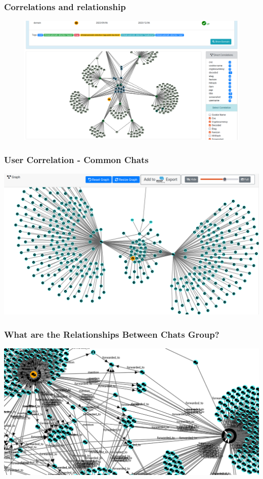 \documentclass{beamer}
\begin{document}
\begin{frame}
    \frametitle{Correlations and relationship}
    \begin{figure}
        \includegraphics[scale=0.23, angle=0]{screenshot/ail-correlation.png}
    \end{figure}
\end{frame}

\begin{frame}
    \frametitle{User Correlation - Common Chats}
    \begin{center}
        \includegraphics[scale=0.26]{screenshot/chat_users_correlation.png}
    \end{center}
\end{frame}

\begin{frame}
    \frametitle{What are the Relationships Between Chats Group?}
    \begin{center}
        \includegraphics[scale=0.27]{screenshot/noname-relationships.png}
    \end{center}
\end{frame}
\end{document}
